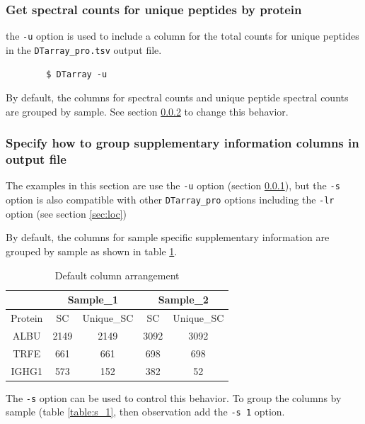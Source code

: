 \documentclass[12pt]{article}
\begin{document}
	\subsubsection{Get spectral counts for unique peptides by protein} \label{sec:unique_sc}
	
	the \texttt{-u} option is used to include a column for the total counts for unique peptides in the \texttt{DTarray\_pro.tsv} output file.
	
	\begin{lstlisting}
		$ DTarray -u
	\end{lstlisting}
	
	By default, the columns for spectral counts and unique peptide spectral counts are grouped by sample.  See section \ref{sec:sup_info} to change this behavior.  
	
	\subsubsection{Specify how to group supplementary information columns in output file} \label{sec:sup_info}
	
	The examples in this section are use the \texttt{-u} option (section \ref{sec:unique_sc}), but the \texttt{-s} option is also compatible with other \texttt{DTarray\_pro} options including the \texttt{-lr} option (see section \ref{sec:loc})
	
	\bigskip
	\noindent
	By default, the columns for sample specific supplementary information are grouped by sample as shown in table \ref{table:s_0}.  
	
	\bigskip
	\begin{table}[h!]
		\centering
		\footnotesize
		\begin{tabular}{ccccc}
			\toprule
			& \multicolumn{2}{c}{Sample\_1}
			& \multicolumn{2}{c}{Sample\_2} \\
			\midrule
			Protein & SC & Unique\_SC & SC & Unique\_SC \\ 
			\midrule
			ALBU & 2149 & 2149 & 3092 & 3092 \\
			TRFE & 661 & 661 & 698 & 698 \\ 
			IGHG1 & 573 & 152 & 382 & 52 \\ 
			\toprule
		\end{tabular}
		\caption{Default column arrangement}
		\label{table:s_0}
	\end{table}
	
	\noindent
	The \texttt{-s} option can be used to control this behavior. To group the columns by sample (table \ref{table:s_1}, then observation add the \texttt{-s 1} option.
	
\end{document}
